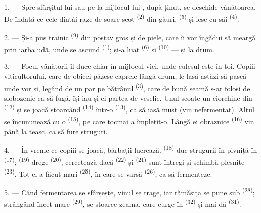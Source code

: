 1. --- Spre sfârșitul lui  sau pe la mijlocul lui
, după ținut, se deschide vânătoarea. De îndată ce cele dintâi
raze de soare scot  \textsuperscript{(2)} din găuri,
 \textsuperscript{(5)} și iese cu  săi
\textsuperscript{(4)}.

2. --- Și-a pus  trainic \textsuperscript{(9)} din
postav gros și  de piele, care îi vor îngădui să meargă prin
iarba udă, unde se ascund  \textsuperscript{(1)}; și-a
luat  \textsuperscript{(6)} și 
\textsuperscript{(10)} --- și la drum.

3. --- Focul vânătorii îl duce chiar în mijlocul viei, unde culesul este în toi.
Copiii viticultorului, care de obicei păzesc caprele lângă drum, le lasă astăzi să
pască unde vor și, legând de un par pe bătrânul  \textsuperscript{(3)},
care de bună seamă s-ar folosi de slobozenie ca să fugă, își iau și ei partea de
veselie. Unul scoate un ciorchine din 
\textsuperscript{(12)} și se joacă stoarcând  \textsuperscript{(14)}
într-o  \textsuperscript{(13)}, ca să iasă must (vin nefermentat).
Altul se încununează cu o  \textsuperscript{(15)}, pe care
tocmai a împletit-o. Lângă ei  obraznice \textsuperscript{(16)} vin
până la teasc, ca să fure struguri.

4. --- În vreme ce copiii se joacă, bărbații lucrează. 
\textsuperscript{(18)} duc strugurii în pivniță în 
\textsuperscript{(17)};  \textsuperscript{(19)} drege
 \textsuperscript{(20)}, cercetează dacă 
\textsuperscript{(22)} și  \textsuperscript{(21)} sunt întregi și
schimbă  plesnite \textsuperscript{(23)}. Tot el a făcut
 mari \textsuperscript{(25)}, în care se varsă 
\textsuperscript{(26)}, ca să fermenteze.

5. --- Când fermentarea se sfârșește, vinul se trage, iar rămășița se pune sub
 \textsuperscript{(28)}; strângând încet  mare
\textsuperscript{(29)}, se stoarce zeama, care curge în 
\textsuperscript{(32)} și mai dă  \textsuperscript{(31)}.

\VUsaut{6.0mm}
\VUsaut{3.4mm}

